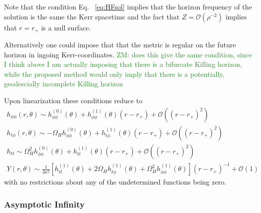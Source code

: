 \documentclass[aps,prd,amsmath,showpacs,amssymb,superscriptaddress,nofootinbib,longbibliography,eqsecnum,preprintnumbers]{revtex4-1}
\newcommand{\zach}[1]{\textcolor{ForestGreen}{#1}}
\begin{document}
Note that the condition Eq. ~\eqref{eq:HFsol} implies that the horizon frequency of the solution is the same the Kerr spacetime and the fact that $Z=\mathcal{O}(\rho^{-2})$ implies that $r=r_+$ is a null surface.

Alternatively one could impose that that the metric is regular on the future horizon in ingoing Kerr-coordinates. \zach{ZM: does this give the same condition, since I think above I am actually imposing that there is a bifurcate Killing horizon, while the proposed method would only imply that there is a potentially, geodescially incomplete Killing horizon}

Upon linearization these conditions reduce to
\begin{align}
h_{\phi\phi}(r,\theta) \sim h_{\phi\phi}^{(0)}(\theta) +h_{\phi\phi}^{(1)}(\theta)(r-r_+) +\mathcal{O}((r-r_+)^2) \nonumber \\
h_{t\phi}(r,\theta )\sim -\Omega_H h_{\phi \phi}^{(0)}(\theta) +h_{t\phi}^{(1)}(\theta)(r-r_+)+\mathcal{O}((r-r_+)^2) \nonumber \\
h_{tt}\sim \Omega_H^2 h_{\phi \phi}^{(0)}(\theta)+h_{tt}^{(1)}(\theta)(r-r_+)  +\mathcal{O}((r-r_+)^2) \nonumber \\
Y(r,\theta) \sim\frac{1}{4\kappa^2} \left[h_{tt}^{(1)}(\theta)+2\Omega_H h_{t\phi}^{(1)}(\theta) +\Omega_H^2 h_{\phi\phi}^{(1)}(\theta)\right](r-r_+)^{-1} +\mathcal{O}(1)
\end{align}
with no restrictions about any of the undetermined functions being zero.

\subsubsection{Asymptotic Infinity}
\label{sec:infyB}
\end{document}
